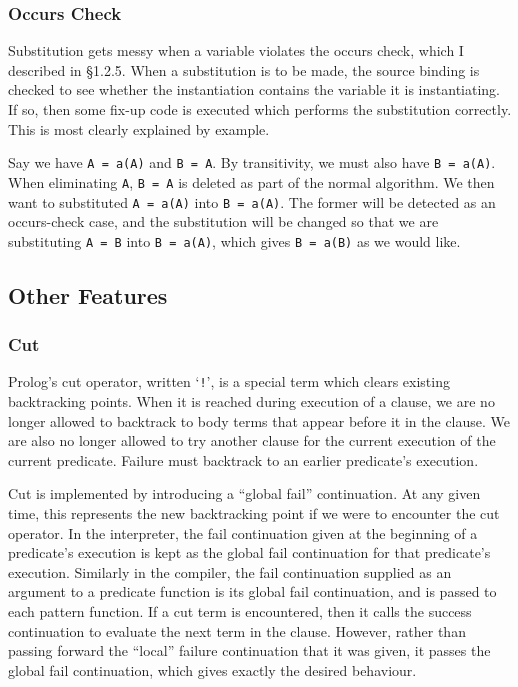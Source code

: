 \documentclass[12pt]{article}
\begin{document}
\subsubsection{Occurs Check}

Substitution gets messy when a variable violates the occurs check, which I described in \S1.2.5. 
When a substitution is to be made, the source binding is checked to see whether the instantiation contains the variable it is instantiating. 
If so, then some fix-up code is executed which performs the substitution correctly. 
This is most clearly explained by example.

Say we have \verb|A = a(A)| and \verb|B = A|. By transitivity, we must also have \verb|B = a(A)|. 
When eliminating \verb|A|, \verb|B = A| is deleted as part of the normal algorithm. 
We then want to substituted \verb|A = a(A)| into \verb|B = a(A)|. 
The former will be detected as an occurs-check case, and the substitution will be changed so that we are substituting \verb|A = B| into \verb|B = a(A)|, which gives \verb|B = a(B)| as we would like.

\subsection{Other Features}

\subsubsection{Cut}

Prolog's cut operator, written `\verb|!|', is a special term which clears existing backtracking points.
When it is reached during execution of a clause, we are no longer allowed to backtrack to body terms that appear before it in the clause. 
We are also no longer allowed to try another clause for the current execution of the current predicate. 
Failure must backtrack to an earlier predicate's execution.

Cut is implemented by introducing a ``global fail'' continuation. 
At any given time, this represents the new backtracking point if we were to encounter the cut operator. 
In the interpreter, the fail continuation given at the beginning of a predicate's execution is kept as the global fail continuation for that predicate's execution. 
Similarly in the compiler, the fail continuation supplied as an argument to a predicate function is its global fail continuation, and is passed to each pattern function.
If a cut term is encountered, then it calls the success continuation to evaluate the next term in the clause.
However, rather than passing forward the ``local'' failure continuation that it was given, it passes the global fail continuation, which gives exactly the desired behaviour.
\end{document}
